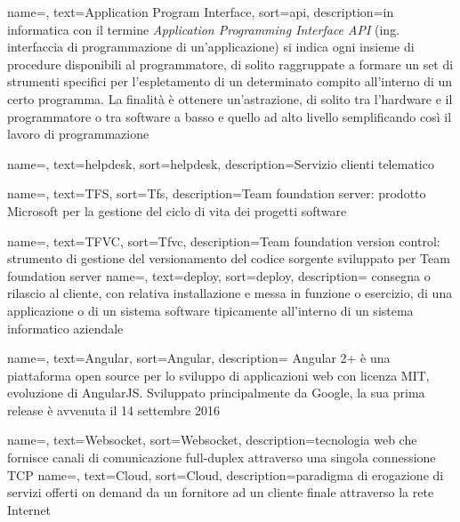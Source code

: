 

{
    name=,
    text=Application Program Interface,
    sort=api,
    description={in informatica con il termine \emph{Application Programming Interface API} (ing. interfaccia di programmazione di un'applicazione) si indica ogni insieme di procedure disponibili al programmatore, di solito raggruppate a formare un set di strumenti specifici per l'espletamento di un determinato compito all'interno di un certo programma. La finalità è ottenere un'astrazione, di solito tra l'hardware e il programmatore o tra software a basso e quello ad alto livello semplificando così il lavoro di programmazione}
}



{
    name=,
    text=helpdesk,
    sort=helpdesk,
    description={Servizio clienti telematico}
}

{
    name=,
    text=TFS,
    sort=Tfs,
    description={Team foundation server: prodotto Microsoft per la gestione del ciclo di vita dei progetti software}
}

{
    name=,
    text=TFVC,
    sort=Tfvc,
    description={Team foundation version control: strumento di gestione del versionamento del codice sorgente sviluppato per Team foundation server}
}
{
    name=,
    text=deploy,
    sort=deploy,
    description={ consegna o rilascio al cliente, con relativa installazione e messa in funzione o esercizio, di una applicazione o di un sistema software tipicamente all'interno di un sistema informatico aziendale}
}

{
    name=,
    text=Angular,
    sort=Angular,
    description={ Angular 2+ è una piattaforma open source per lo sviluppo di applicazioni web con licenza MIT, evoluzione di AngularJS. Sviluppato principalmente da Google, la sua prima release è avvenuta il 14 settembre 2016}
}

{
    name=,
    text=Websocket,
    sort=Websocket,
    description={tecnologia web che fornisce canali di comunicazione full-duplex attraverso una singola connessione TCP}
}
{
    name=,
    text=Cloud,
    sort=Cloud,
    description={paradigma di erogazione di servizi offerti on demand da un fornitore ad un cliente finale attraverso la rete Internet}
}


